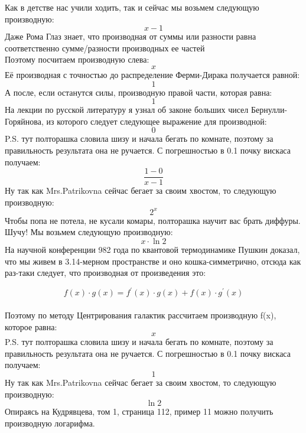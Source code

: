 \documentclass[a4paper,12pt]{article}
\begin{document}
Как в детстве нас учили ходить, так и сейчас мы возьмем следующую производную:
\begin{equation}
x-1
\end{equation} 
Даже Рома Глаз знает, что производная от суммы или разности равна соответственно сумме/разности производных ее частей\\Поэтому посчитаем производную слева: 
\begin{equation}
x
\end{equation} 
Её производная с точностью до распределение Ферми-Дирака получается равной:
\begin{equation}
1
\end{equation} 
А после, если останутся силы, производную правой части, которая равна: 
\begin{equation}
1
\end{equation} 
На лекции по русской литературу я узнал об законе больших чисел Бернулли-Горяйнова, из которого следует следующее выражение для производной:
\begin{equation}
0
\end{equation} 
 P.S. тут полторашка словила шизу и начала бегать по комнате, поэтому за правильность результата она не ручается. С погрешностью в 0.1 почку вискаса получаем:
\begin{equation}
\frac{1-0}{x-1} 
\end{equation} 
Ну так как Mrs.Patrikovna сейчас бегает за своим хвостом, то следующую производную: 
\begin{equation}
2^{x} 
\end{equation} 
Чтобы попа не потела, не кусали комары, полторашка научит вас брать диффуры. Шучу! Мы возьмем следующую производную:
\begin{equation}
x \cdot \ln2
\end{equation} 
На научной конференции 982 года по квантовой термодинамике Пушкин доказал, что мы живем в 3.14-мерном пространстве и оно кошка-симметрично, отсюда как раз-таки следует, что производная от произведения это:

  \begin{equation}
  f(x) \cdot g(x) = f^{'}(x) \cdot g(x) + f(x) \cdot g^{'}(x)
 \end{equation} \\Поэтому по методу Центрирования галактик рассчитаем производную f(x), которое равна: 
\begin{equation}
x
\end{equation} 
 P.S. тут полторашка словила шизу и начала бегать по комнате, поэтому за правильность результата она не ручается. С погрешностью в 0.1 почку вискаса получаем:
\begin{equation}
1
\end{equation} 
Ну так как Mrs.Patrikovna сейчас бегает за своим хвостом, то следующую производную: 
\begin{equation}
\ln2
\end{equation} 
Опираясь на Кудрявцева, том 1, страница 112, пример 11 можно получить производную логарифма.
\end{document}
